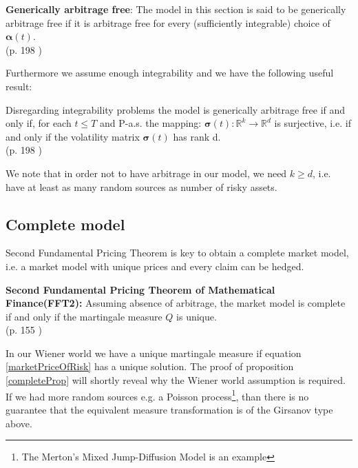 \theoremstyle{definition}
\begin{definition}{\textbf{Generically arbitrage free}:}
The model in this section is said to be generically arbitrage free if it is arbitrage free for every (sufficiently integrable) choice of $\bm{\alpha}(t)$.
\\ \null \hfill (p. 198 \parencite{finKont})
\end{definition}

Furthermore we assume enough integrability and we have the following useful result:
\theoremstyle{proposition}
\begin{proposition}{}\label{arbitrageFreeProp}
Disregarding integrability problems the model is generically arbitrage free if and only if, for each $t\leq T$ and P-a.s. the mapping:
$\bm{\sigma}(t):\mathbb{R}^k \to \mathbb{R}^d$ is surjective, i.e. if and only if the volatility matrix $\bm{\sigma}(t)$ has rank d.
\\ \null \hfill(p. 198 \parencite{finKont})
\end{proposition}
We note that in order not to have arbitrage in our model, we need $k\geq d$, i.e. have at least as many random sources as number of risky assets.

\subsection{Complete model}
Second Fundamental Pricing Theorem is key to obtain a complete market model, i.e. a market model with unique prices and every claim can be hedged.
\begin{theorem}\label{FFT2}
\textbf{Second Fundamental Pricing Theorem of Mathematical Finance(FFT2): } Assuming absence of arbitrage, the market model is complete if and only if the martingale measure $Q$ is unique.
\\ \null \hfill (p. 155 \parencite{finKont})
\end{theorem}
In our Wiener world we have a unique martingale measure if equation \ref{marketPriceOfRisk} has a unique solution. The proof of proposition \ref{completeProp} will shortly reveal why the Wiener world assumption is required. If we had more random sources e.g. a Poisson process\footnote{The Merton's Mixed Jump-Diffusion Model is an example}, than there is no guarantee that the equivalent measure transformation is of the Girsanov type above. 

